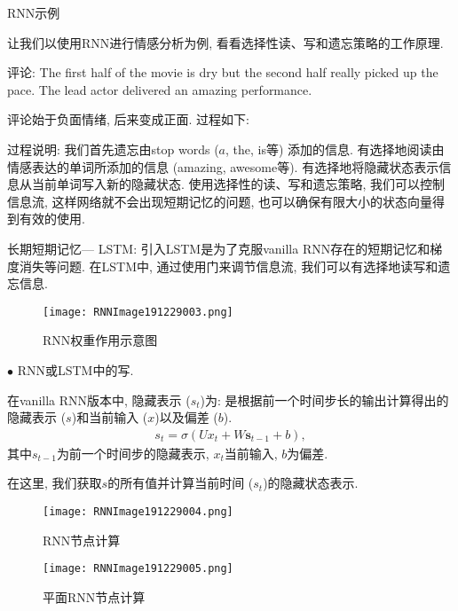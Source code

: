 \begin{example}RNN示例

让我们以使用RNN进行情感分析为例, 看看选择性读、写和遗忘策略的工作原理.

\begin{tcolorbox}
    评论: The first half of the movie is dry but the second half really picked up the pace. The lead actor delivered an amazing performance.
\end{tcolorbox}

评论始于负面情绪, 后来变成正面. 过程如下:

过程说明: 我们首先遗忘由stop words ($a$, the, is等) 添加的信息. 有选择地阅读由情感表达的单词所添加的信息 (amazing, awesome等).
有选择地将隐藏状态表示信息从当前单词写入新的隐藏状态.
使用选择性的读、写和遗忘策略, 我们可以控制信息流, 这样网络就不会出现短期记忆的问题, 也可以确保有限大小的状态向量得到有效的使用.

长期短期记忆— LSTM: 引入LSTM是为了克服vanilla RNN存在的短期记忆和梯度消失等问题.
在LSTM中, 通过使用门来调节信息流, 我们可以有选择地读写和遗忘信息.
\begin{figure}[H]
    \centering
    \texttt{[image: RNNImage191229003.png]}
    \caption{RNN权重作用示意图}
    \label{RNNImage191229003}
    \vspace{-0.4cm}
\end{figure}

$\bullet$ RNN或LSTM中的写.

在vanilla RNN版本中, 隐藏表示 ($s_t$)为: 是根据前一个时间步长的输出计算得出的隐藏表示 ($s$)和当前输入 ($x$)以及偏差 ($b$).
\begin{align}
  s_{t}=\sigma\left (U x_{t}+W \mathbf{s}_{t-1}+b\right),
\end{align}
其中$s_{t-1}$为前一个时间步的隐藏表示, $x_t$当前输入, $b$为偏差.

在这里, 我们获取$s$的所有值并计算当前时间 ($s_t$)的隐藏状态表示.
\begin{figure}[H]
\centering
\texttt{[image: RNNImage191229004.png]}
\caption{RNN节点计算}
\label{RNNImage191229004}\vspace{-0.4cm}
\end{figure}
\begin{figure}[H]
\centering
\texttt{[image: RNNImage191229005.png]}
\caption{平面RNN节点计算}
\label{RNNImage191229005}\vspace{-0.4cm}
\end{figure}


\end{example}
